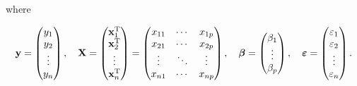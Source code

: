 where

\begin{equation}
   \mathbf{y} = \begin{pmatrix} y_1 \\ y_2 \\ \vdots \\ y_n \end{pmatrix}, \quad
   \mathbf{X} = \begin{pmatrix} \mathbf{x}^{\rm T}_1 \\ \mathbf{x}^{\rm T}_2 \\ \vdots \\ \mathbf{x}^{\rm T}_n \end{pmatrix}
   = \begin{pmatrix} x_{11} & \cdots & x_{1p} \\
   x_{21} & \cdots & x_{2p} \\
   \vdots & \ddots & \vdots \\
   x_{n1} & \cdots & x_{np}
   \end{pmatrix}, \quad
   \boldsymbol\beta = \begin{pmatrix} \beta_1 \\ \vdots \\ \beta_p \end{pmatrix}, \quad
   \boldsymbol\varepsilon = \begin{pmatrix} \varepsilon_1 \\ \varepsilon_2 \\ \vdots \\ \varepsilon_n \end{pmatrix}.
\end{equation}

